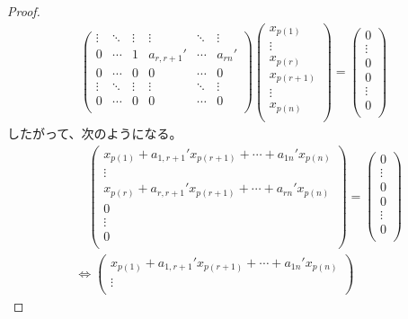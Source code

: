 \documentclass[dvipdfmx]{jsarticle}
\begin{document}
\begin{proof}
\begin{align*}
\begin{pmatrix}
 \vdots & \ddots & \vdots & \vdots & \ddots & \vdots \\
0 & \cdots & 1 & a_{r,r + 1}' & \cdots & a_{rn}' \\
0 & \cdots & 0 & 0 & \cdots & 0 \\
 \vdots & \ddots & \vdots & \vdots & \ddots & \vdots \\
0 & \cdots & 0 & 0 & \cdots & 0 \\
\end{pmatrix}\begin{pmatrix}
x_{p(1)} \\
 \vdots \\
x_{p(r)} \\
x_{p(r + 1)} \\
 \vdots \\
x_{p(n)} \\
\end{pmatrix} = \begin{pmatrix}
0 \\
 \vdots \\
0 \\
0 \\
 \vdots \\
0 \\
\end{pmatrix}\end{align*}
したがって、次のようになる。
\begin{align*}
&\quad \begin{pmatrix}
x_{p(1)} + a_{1,r + 1}'x_{p(r + 1)} + \cdots + a_{1n}'x_{p(n)} \\
 \vdots \\
x_{p(r)} + a_{r,r + 1}'x_{p(r + 1)} + \cdots + a_{rn}'x_{p(n)} \\
0 \\
 \vdots \\
0 \\
\end{pmatrix} = \begin{pmatrix}
0 \\
 \vdots \\
0 \\
0 \\
 \vdots \\
0 \\
\end{pmatrix}\\
&\Leftrightarrow \begin{pmatrix}
x_{p(1)} + a_{1,r + 1}'x_{p(r + 1)} + \cdots + a_{1n}'x_{p(n)} \\
 \vdots \\

\end{pmatrix}
\end{align*}
\end{proof}
\end{document}
